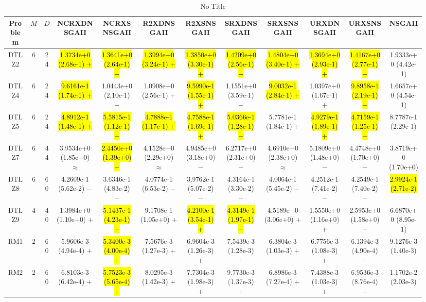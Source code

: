\documentclass[journal]{IEEEtran}
\begin{document}
\begin{table*}[htbp]
\renewcommand{\arraystretch}{1.2}
\centering
\caption{No Title}
\begin{tabular}{cccccccccccc}
\toprule
Problem&$M$&$D$&NCRXDNSGAII&NCRXSNSGAII&R2XDNSGAII&R2XSNSGAII&SRXDNSGAII&SRXSNSGAII&URXDNSGAII&URXSNSGAII&NSGAII\\
\midrule
\multirow{1}{*}{DTLZ2}&6&24&\hl{1.3734e+0 (2.68e-1) $+$}&\hl{1.3641e+0 (2.64e-1) $+$}&\hl{1.3994e+0 (3.24e-1) $+$}&\hl{1.3850e+0 (3.30e-1) $+$}&\hl{1.4209e+0 (2.56e-1) $+$}&\hl{1.4804e+0 (3.40e-1) $+$}&\hl{1.3694e+0 (2.93e-1) $+$}&\hl{1.4167e+0 (2.77e-1) $+$}&1.9333e+0 (4.42e-1)\\
\hline
\multirow{1}{*}{DTLZ4}&6&24&\hl{9.6161e-1 (1.74e-1) $+$}&1.0443e+0 (2.10e-1) $+$&1.0908e+0 (2.56e-1) $+$&\hl{9.5990e-1 (1.55e-1) $+$}&1.1551e+0 (3.59e-1) $+$&\hl{9.0032e-1 (2.84e-1) $+$}&1.0397e+0 (1.67e-1) $+$&\hl{9.8958e-1 (2.19e-1) $+$}&1.6657e+0 (4.54e-1)\\
\hline
\multirow{1}{*}{DTLZ5}&6&24&\hl{4.8912e-1 (1.48e-1) $+$}&\hl{5.5815e-1 (1.12e-1) $+$}&\hl{4.7888e-1 (1.17e-1) $+$}&\hl{4.7588e-1 (1.69e-1) $+$}&\hl{5.0366e-1 (1.28e-1) $+$}&5.7781e-1 (1.84e-1) $+$&\hl{4.9279e-1 (1.89e-1) $+$}&\hl{4.7159e-1 (1.25e-1) $+$}&8.7787e-1 (2.29e-1)\\
\hline
\multirow{1}{*}{DTLZ7}&6&44&3.9534e+0 (1.85e+0) $\approx$&\hl{2.4450e+0 (1.39e+0) $+$}&4.1528e+0 (2.29e+0) $\approx$&4.9485e+0 (3.18e+0) $-$&6.2717e+0 (2.31e+0) $-$&4.6910e+0 (2.38e+0) $\approx$&5.1809e+0 (1.48e+0) $-$&4.4748e+0 (1.70e+0) $-$&3.8719e+0 (1.70e+0)\\
\hline
\multirow{1}{*}{DTLZ8}&6&60&4.2609e-1 (5.62e-2) $-$&3.6346e-1 (4.83e-2) $-$&4.0774e-1 (6.53e-2) $-$&3.9762e-1 (5.07e-2) $-$&4.3164e-1 (3.30e-2) $-$&4.0064e-1 (5.45e-2) $-$&4.2512e-1 (7.41e-2) $-$&4.2549e-1 (7.40e-2) $-$&\hl{2.9924e-1 (2.71e-2)}\\
\hline
\multirow{1}{*}{DTLZ9}&4&40&1.3984e+0 (1.10e+0) $+$&\hl{5.1437e-1 (4.23e-1) $+$}&9.1708e-1 (1.05e+0) $+$&\hl{4.2100e-1 (3.54e-1) $+$}&\hl{4.3149e-1 (1.97e-1) $+$}&4.5189e+0 (3.06e+0) $+$&1.5550e+0 (1.16e+0) $+$&2.5953e+0 (1.58e+0) $+$&6.6870e+0 (8.95e-1)\\
\hline
\multirow{1}{*}{RM1}&2&60&5.9606e-3 (4.94e-4) $+$&\hl{5.3400e-3 (4.00e-4) $+$}&7.5676e-3 (1.27e-3) $+$&6.9604e-3 (1.26e-3) $+$&7.5439e-3 (1.28e-3) $+$&6.3804e-3 (1.03e-3) $+$&6.7756e-3 (1.08e-3) $+$&6.1394e-3 (4.90e-4) $+$&9.1276e-3 (1.40e-3)\\
\hline
\multirow{1}{*}{RM2}&2&60&6.8103e-3 (6.42e-4) $+$&\hl{5.7523e-3 (5.65e-4) $+$}&8.0295e-3 (1.42e-3) $+$&7.7304e-3 (1.98e-3) $+$&9.7730e-3 (1.37e-3) $+$&6.8986e-3 (7.27e-4) $+$&7.4388e-3 (1.03e-3) $+$&6.9536e-3 (8.76e-4) $+$&1.1702e-2 (2.03e-3)\\

\end{tabular}
\end{table*}
\end{document}
